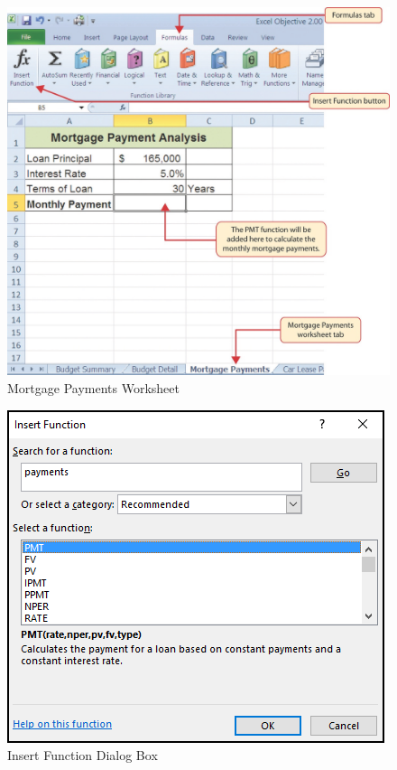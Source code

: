 \begin{figure}[H]
	\centering
	\includegraphics[width=\maxwidth{.95\linewidth}]{gfx/ch02_fig30}
	\caption{Mortgage Payments Worksheet}
	\label{02:fig30}
\end{figure}

\begin{figure}[H]
	\centering
	\includegraphics[width=\maxwidth{.95\linewidth}]{gfx/ch02_fig31}
	\caption{Insert Function Dialog Box}
	\label{02:fig31}
\end{figure}

